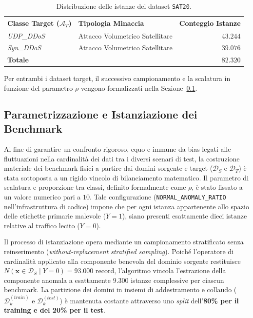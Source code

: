 \begin{table}[H]
    \centering
    \small
    \caption{Distribuzione delle istanze del dataset \texttt{SAT20}.}
    \label{tab:sat20_distribution}
    \begin{tabular}{llr}
        \toprule
        \textbf{Classe Target ($\mathcal{A}_T$)} & \textbf{Tipologia Minaccia} & \textbf{Conteggio Istanze} \\
        \midrule
        \textit{UDP\_DDoS} & Attacco Volumetrico Satellitare & $43.244$ \\
        \textit{Syn\_DDoS} & Attacco Volumetrico Satellitare & $39.076$ \\
        \hline
        \textbf{Totale} & & $\mathbf{82.320}$ \\
        \bottomrule
    \end{tabular}
\end{table}

Per entrambi i dataset target, il successivo campionamento e la scalatura in funzione del parametro $\rho$ vengono formalizzati nella Sezione~\ref{subsec:parametrizzazione_benchmark}.

\subsection{Parametrizzazione e Istanziazione dei Benchmark}
\label{subsec:parametrizzazione_benchmark}

Al fine di garantire un confronto rigoroso, equo e immune da bias legati alle fluttuazioni nella cardinalità dei dati tra i diversi scenari di test, la costruzione materiale dei benchmark fisici a partire dai domini sorgente e target ($\mathcal{D}_S$ e $\mathcal{D}_T$) è stata sottoposta a un rigido vincolo di bilanciamento matematico. 
Il parametro di scalatura e proporzione tra classi, definito formalmente come $\rho$, è stato fissato a un valore numerico pari a $10$. Tale configurazione (\texttt{NORMAL\_ANOMALY\_RATIO} nell'infrastruttura di codice) impone che per ogni istanza appartenente allo spazio delle etichette primarie malevole ($Y=1$), siano presenti esattamente dieci istanze relative al traffico lecito ($Y=0$).

Il processo di istanziazione opera mediante un campionamento stratificato senza reinserimento (\textit{without-replacement stratified sampling}). 
Poiché l'operatore di cardinalità applicato alla componente benevola del dominio sorgente restituisce $N(\mathbf{x} \in \mathcal{D}_S \mid Y=0) = 93.000$ record, l'algoritmo vincola l'estrazione della componente anomala a esattamente $9.300$ istanze complessive per ciascun benchmark. 
La partizione dei domini in insiemi di addestramento e collaudo ($\mathcal{D}_k^{(train)}$ e $\mathcal{D}_k^{(test)}$) è mantenuta costante attraverso uno \textit{split} dell'\textbf{80\% per il training e del 20\% per il test}.

